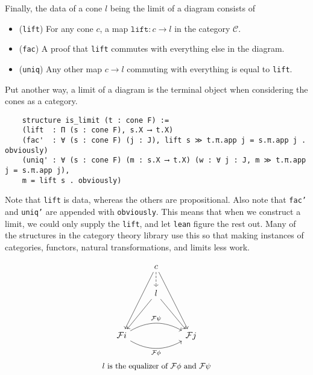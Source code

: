 \documentclass{article}
\newcommand{\CC}{\mathcal{C}}
\newcommand{\FF}{\mathcal{F}}
\newcommand{\<}{\langle}
\renewcommand{\>}{\rangle}
\theoremstyle{definitionstyle}
\theoremstyle{exercisestyle}
\theoremstyle{remarkstyle}
\begin{document}
\begin{dfn}
  Finally, the data of a cone $l$ being the limit of a diagram consists of
  \begin{itemize}
    \item (\texttt{lift}) For any cone $c$, a map $\texttt{lift} : c \to l$ in the category $\CC$.
    \item (\texttt{fac}) A proof that \texttt{lift} commutes with everything else in the diagram.
    \item (\texttt{uniq}) Any other map $c \to l$ commuting with everything is equal to \texttt{lift}.
  \end{itemize}

  Put another way, a limit of a diagram is the terminal object when considering
  the cones as a category.

  \begin{lstlisting}
    structure is_limit (t : cone F) :=
    (lift  : Π (s : cone F), s.X ⟶ t.X)
    (fac'  : ∀ (s : cone F) (j : J), lift s ≫ t.π.app j = s.π.app j . obviously)
    (uniq' : ∀ (s : cone F) (m : s.X ⟶ t.X) (w : ∀ j : J, m ≫ t.π.app j = s.π.app j),
    m = lift s . obviously)
  \end{lstlisting}

  Note that \texttt{lift} is data, whereas the others are propositional.
  Also note that \texttt{fac'} and \texttt{uniq'}
  are appended with \texttt{obviously}.
  This means that when we construct a limit, we could only
  supply the \texttt{lift}, and let \texttt{lean} figure the rest out.
  Many of the structures in the category theory library use this
  so that making instances of categories, functors, natural transformations,
  and limits less work.

  \[\begin{tikzcd}
    & c \\
  	& l \\
  	\\
  	{\mathcal{F} i} && {\mathcal{F} j}
  	\arrow["{\mathcal{F} \phi}"', bend right={30}, from=4-1, to=4-3]
  	\arrow["{\mathcal{F} \psi}", bend right={-30}, from=4-1, to=4-3]
  	\arrow[from=1-2, to=4-1]
  	\arrow[from=1-2, to=4-3]
  	\arrow[from=2-2, to=4-1]
  	\arrow[from=2-2, to=4-3]
    \arrow[dashed, from=1-2, to=2-2]
  \end{tikzcd}\]
  \[ \text{\small $l$ is the equalizer of $\FF \phi$ and $\FF \psi$}\]
\end{dfn}
\end{document}
